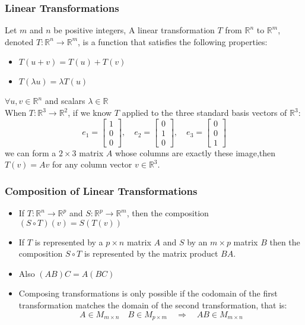 \documentclass[a4paper, 9pt]{extarticle}
\begin{document}
\subsubsection*{Linear Transformations}
Let $m$ and $n$ be positive integers, A linear transformation $T$ from $\mathbb{R}^n$ to $\mathbb{R}^m$, denoted $T: \mathbb{R}^n \to \mathbb{R}^m$, is a function that satisfies the following properties:
\begin{itemize}
  \item $T(u+v) = T(u) + T(v)$
  \item $T(\lambda u) = \lambda T(u)$
\end{itemize}
$\forall u, v \in \mathbb{R}^n$ and scalars $\lambda \in \mathbb{R}$ \\[2ex]
When $T : \mathbb{R}^3 \to \mathbb{R}^2$, if we know $T$ applied to the three standard basis vectors of $\mathbb{R}^3$:
$$e_1 = \begin{bmatrix}
    1 \\
    0 \\
    0
  \end{bmatrix}, \quad
  e_2 = \begin{bmatrix}
    0 \\
    1 \\
    0
  \end{bmatrix}, \quad
  e_3 = \begin{bmatrix}
    0 \\
    0 \\
    1
  \end{bmatrix}$$
we can form a $2 \times 3$ matrix $A$ whose columns are exactly these image,then $T(v) = Av$ for any column vector $v \in \mathbb{R}^3$.
\subsubsection*{Composition of Linear Transformations}
\begin{itemize}
  \item If $T: \mathbb{R}^n \to \mathbb{R}^p$ and $S: \mathbb{R}^p \to \mathbb{R}^m$, then the composition $(S \circ T)(v) = S(T(v))$
  \item If $T$ is represented by a $p \times n$ matrix $A$ and $S$ by an $m \times p$ matrix $B$ then the composition $S \circ T$ is represented by the matrix product $BA$.
  \item Also $(AB)C = A(BC)$
  \item Composing transformations is only possible if the codomain of the first transformation matches the domain of the second transformation, that is:
        $$A \in M_{m \times n} \quad B \in M_{p \times m} \quad \Rightarrow \quad AB \in M_{m \times n}$$
\end{itemize}
\end{document}
